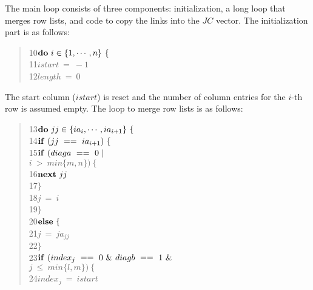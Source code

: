 The main loop consists of three components:  initialization, a long loop that
merges row lists, and code to copy the links into the $JC$ vector.  The
initialization part is as follows:
\begin{quote}
10\hspace*{ 4em}$ {\bf do}\ i\in\{1,\cdots,n\}\ \{ $ \\
11\hspace*{ 8em}$     istart\ =\ -1 $ \\
12\hspace*{ 8em}$     length\ =\ 0 $
\end{quote}
The start column ($istart$) is reset and the number of column entries for the
$i$-th row is assumed empty.  The loop to merge row lists is as follows:
\begin{quote}
13\hspace*{ 8em}$     {\bf do}\ jj\in\{ia_{i},\cdots,ia_{i+1}\}\ \{ $ \\
14\hspace*{12em}$         {\bf if}\ (jj\ ==\ ia_{i+1})\ \{ $ \\
15\hspace*{16em}$             {\bf if}\ (diaga\ ==\ 0\ | $ \\
  \hspace*{19em}$                        i\ >\ min\{m,n\})\ \{ $ \\
16\hspace*{20em}$                 {\bf next}\ jj $ \\
17\hspace*{20em}$                 \} $ \\
18\hspace*{16em}$             j\ =\ i $ \\
19\hspace*{16em}$             \} $ \\
20\hspace*{12em}$         {\bf else}\ \{ $ \\
21\hspace*{16em}$             j\ =\ ja_{jj} $ \\
22\hspace*{16em}$             \} $ \\
23\hspace*{12em}$         {\bf if}\ (index_{j}\ ==\ 0\ \&\ diagb\ ==\ 1\ \& $ \\
  \hspace*{15em}$                    j\ \leq\ min\{l,m\})\ \{ $ \\
24\hspace*{16em}$             index_{j}\ =\ istart $ \\

\end{quote}
